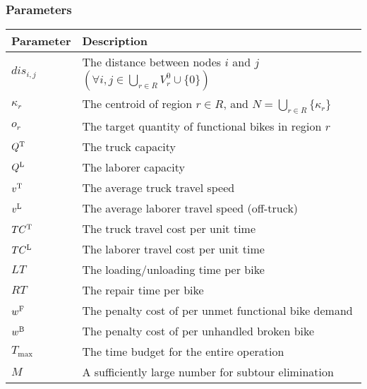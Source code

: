 \subsubsection{Parameters}

\renewcommand{\arraystretch}{1.25}
\begin{longtable}{p{2cm}p{10cm}}
    \toprule
    Parameter   & Description                                                                                               \\
    \midrule
    \endhead
    $dis_{i,j}$ & The distance between nodes $i$ and $j$ $\left(\forall i, j \in \bigcup_{r \in R} V^0_r \cup \{0\}\right)$ \\
    $\kappa_r$  & The centroid of region $r \in R$, and $N = \bigcup_{r \in R} \{\kappa_r\}$                                \\
    $o_r$       & The target quantity of functional bikes in region $r$                                                     \\
    $Q^{\text{T}}$    & The truck capacity                                                                                        \\
    $Q^{\text{L}}$    & The laborer capacity                                                                                      \\
    $v^{\text{T}}$    & The average truck travel speed                                                                            \\
    $v^{\text{L}}$    & The average laborer travel speed (off-truck)                                                              \\
    $TC^{\text{T}}$   & The truck travel cost per unit time                                                                       \\
    $TC^{\text{L}}$   & The laborer travel cost per unit time                                                                     \\
    $LT$        & The loading/unloading time per bike                                                                       \\
    $RT$        & The repair time per bike                                                                                  \\
    $w^{\text{F}}$    & The penalty cost of per unmet functional bike demand                                                      \\
    $w^{\text{B}}$    & The penalty cost of per unhandled broken bike                                                             \\
    $T_{\max}$  & The time budget for the entire operation                                                                  \\
    $M$         & A sufficiently large number for subtour elimination                                                       \\
    \bottomrule
\end{longtable}

